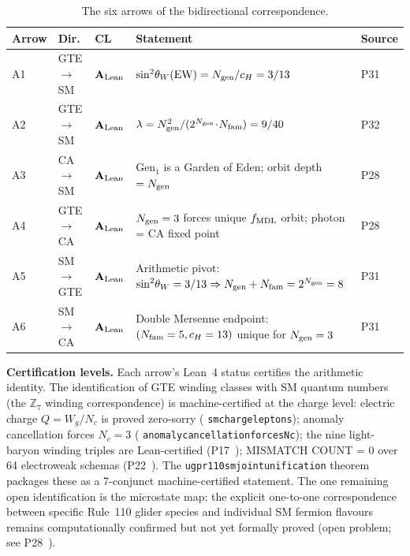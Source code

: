 \documentclass[11pt]{article}
\theoremstyle{remark}
\newcommand{\ZS}{\mathbb{Z}_7}
\newcommand{\Ngen}{N_{\rm gen}}
\newcommand{\Nfam}{N_{\rm fam}}
\newcommand{\cH}{c_H}
\newcommand{\fmdl}{f_{\rm MDL}}
\newcommand{\lean}[1]{%
  \penalty-100
  \begingroup\def\_{\textunderscore\allowbreak}\texttt{#1}\endgroup}
\newcommand{\sinwsq}{\sin^2\!\theta_W}
\newcommand{\lam}{\lambda}
\newcommand{\CatAL}{\ensuremath{\textbf{A}_{\rm Lean}}}
\begin{document}
\begin{table}[H]
\centering
\caption{The six arrows of the bidirectional correspondence.}
\label{tab:six_arrows}
\small
\renewcommand{\arraystretch}{1.25}
\begin{tabularx}{\linewidth}{@{}lllXp{1.5cm}@{}}
\toprule
\textbf{Arrow} & \textbf{Dir.} & \textbf{CL} & \textbf{Statement} & \textbf{Source} \\
\midrule
A1 & GTE$\!\to\!$SM & $\CatAL$ & $\sinwsq(\text{EW}) = \Ngen/\cH = 3/13$ & P31~\cite{SpivackWeinbergAngle} \\
A2 & GTE$\!\to\!$SM & $\CatAL$ & $\lam = \Ngen^2/(2^{\Ngen}\!\cdot\!\Nfam) = 9/40$ & P32~\cite{SpivackCKM} \\
A3 & CA$\!\to\!$SM  & $\CatAL$ & Gen$_1$ is a Garden of Eden; orbit depth $= \Ngen$ & P28~\cite{SpivackCompUniversality} \\
A4 & GTE$\!\to\!$CA & $\CatAL$ & $\Ngen = 3$ forces unique $\fmdl$ orbit; photon = CA fixed point & P28~\cite{SpivackCompUniversality} \\
A5 & SM$\!\to\!$GTE & $\CatAL$ & Arithmetic pivot: $\sinwsq = 3/13 \Rightarrow \Ngen + \Nfam = 2^{\Ngen} = 8$ & P31~\cite{SpivackWeinbergAngle} \\
A6 & SM$\!\to\!$CA  & $\CatAL$ & Double Mersenne endpoint: $(\Nfam=5, \cH=13)$ unique for $\Ngen=3$ & P31~\cite{SpivackWeinbergAngle} \\
\bottomrule
\end{tabularx}
\end{table}

\textbf{Certification levels.}
Each arrow's Lean~4 status certifies the arithmetic identity. The identification of GTE
winding classes with SM quantum numbers (the $\ZS$ winding correspondence) is
machine-certified at the charge level: electric charge $Q = W_g/N_c$ is proved
zero-sorry (\lean{sm\_charge\_leptons}); anomaly cancellation forces $N_c = 3$
(\lean{anomaly\_cancellation\_forces\_Nc\_3}); the nine light-baryon winding triples are
Lean-certified (P17~\cite{SpivackBraidAtlas}); MISMATCH COUNT = 0 over 64
electroweak schemas (P22~\cite{SpivackUGPDynamics}).
The \lean{ugp\_r110\_sm\_joint\_unification} theorem packages these as a 7-conjunct
machine-certified statement. The one remaining open identification is the microstate
map: the explicit one-to-one correspondence between specific Rule~110 glider species
and individual SM fermion flavours remains computationally confirmed but not yet
formally proved (open problem; see P28~\cite{SpivackCompUniversality}).
\end{document}
